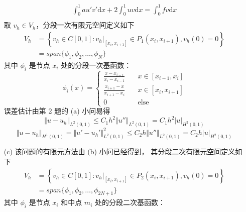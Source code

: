 \documentclass[a4paper]{article}
\begin{document}
\begin{enumerate}
\begin{equation}
\begin{gathered}
            \int_{0}^{1}au'v'\text{d}x + 2\int_{0}^{1}uv\text{d}x = \int_{0}^{1}fv\text{d}x \\
        \end{gathered}
    \end{equation}
    取 $v_h \in V_h$，分段一次有限元空间定义如下
    \begin{equation}
        \begin{aligned}
            V_h&=\left\{
                v_h\in C[0,1] : v_h|_{[x_i,x_{i+1}]}\in P_1(x_i,x_{i+1}), v_h(0)=0
            \right\}\\
            &=span\{\phi_1, \phi_2, \ldots, \phi_N\}
        \end{aligned}
    \end{equation}
    其中 $\phi_i$ 是节点 $x_i$ 处的分段一次基函数：
    \begin{equation}
        \phi_i(x) = \begin{cases}
            \displaystyle\frac{x-x_{i-1}}{x_i-x_{i-1}} \quad & x\in [x_{i-1}, x_i] \\
            \displaystyle\frac{x_{i+1}-x}{x_{i+1}-x_i} & x\in [x_i, x_{i+1}] \\
            0 & \text{else}
        \end{cases}
    \end{equation}
    误差估计由第 2 题的 (a) 小问易得
    \begin{equation}
        \Vert u-u_h \Vert_{L^2(0,1)} \leq C_1 h^2 \Vert u'' \Vert_{L^2(0,1)}
        = C_1 h^2 |u|_{H^2(0,1)}
    \end{equation}
    \begin{equation}
        \Vert u-u_h \Vert_{H^1(0,1)}
        = \Vert u'-u_h' \Vert^2_{L^2(0,1)}
        \leq C_2 h \Vert u'' \Vert_{L^2(0,1)}
        = C_2 h |u|_{H^2(0,1)}
    \end{equation}
    \item[(c)] 该问题的有限元方法由 (b) 小问已经得到，
            其分段二次有限元空间定义如下
            \begin{equation}
                \begin{aligned}
                    V_h&=\left\{
                        v_h\in C[0,1] : v_h|_{[x_i,x_{i+1}]}\in P_2(x_i,x_{i+1}), v_h(0)=0
                    \right\}\\
                    &=span\{\phi_1, \phi_2, \ldots, \phi_{2N+1}\}
                \end{aligned}
            \end{equation}
            其中 $\phi_i$ 是节点 $x_i$ 和中点 $m_i$ 处的分段二次基函数：

\end{enumerate}
\end{document}
